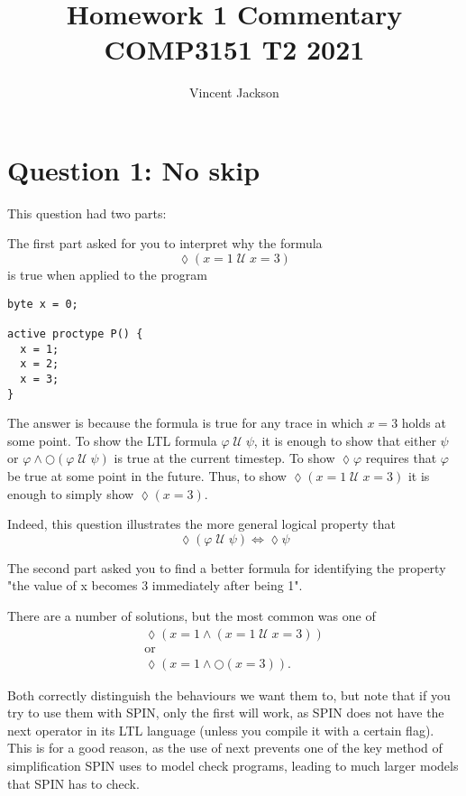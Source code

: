 \documentclass{article}
\begin{document}
\title{Homework 1 Commentary \\ COMP3151 T2 2021}
\author{Vincent Jackson}
\maketitle

\section{Question 1: No skip}

This question had two parts:

The first part asked for you to interpret why the formula
$$\lozenge (x = 1 \mathop{\mathcal{U}} x = 3)$$
is true when applied to the program
\begin{verbatim}  
byte x = 0;

active proctype P() {
  x = 1;
  x = 2;
  x = 3;
}
\end{verbatim}

The answer is because the formula is true for any trace in which $x = 3$ holds at some point.
To show the LTL formula $\varphi \mathop{\mathcal{U}} \psi$, it is enough
to show that either $\psi$ or $\varphi \wedge \bigcirc(\varphi \mathop{\mathcal{U}} \psi)$ is true
at the current timestep. To show $\lozenge \varphi$ requires that $\varphi$ be true
at some point in the future. Thus, to show 
$\lozenge (x = 1 \mathop{\mathcal{U}} x = 3)$ it is enough to simply show $\lozenge(x = 3)$.

Indeed, this question illustrates the more general logical property that
$$\lozenge (\varphi \mathop{\mathcal{U}} \psi) \Leftrightarrow \lozenge \psi$$

The second part asked you to find a better formula for identifying the property
"the value of x becomes 3 immediately after being 1".

There are a number of solutions, but the most common was one of
\begin{gather*}
  \lozenge (x = 1 \wedge (x = 1 \mathop{\mathcal{U}} x = 3)) \\
  \text{or} \\
  \lozenge (x = 1 \wedge \bigcirc(x = 3)).
\end{gather*}

Both correctly distinguish the behaviours we want them to, but note that
if you try to use them with SPIN, only the first will work, as SPIN does not
have the next operator in its LTL language (unless you compile it with a certain flag).
This is for a good reason, as the use of next prevents one of the key method of
simplification SPIN uses to model check programs, leading to much larger models
that SPIN has to check.
\end{document}
